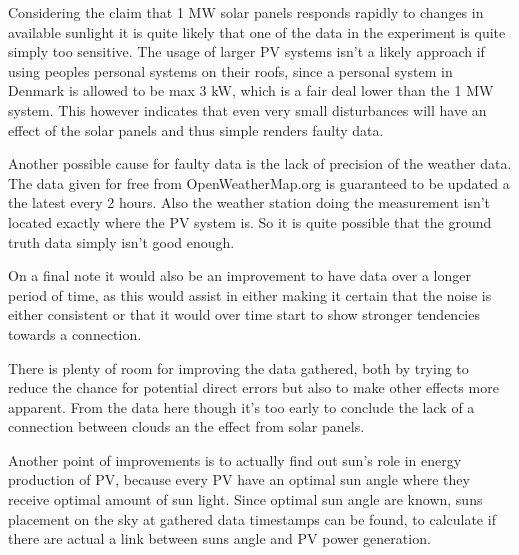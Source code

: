 Considering the claim that 1 MW solar panels responds rapidly to
changes in available sunlight \citep{cloudTrack} it is quite likely
that one of the data in the experiment is quite simply too sensitive.
The usage of larger PV systems isn't a likely approach if using
peoples personal systems on their roofs, since a personal system in
Denmark is allowed to be max 3 kW, which is a fair deal lower than the
1 MW system.  This however indicates that even very small disturbances
will have an effect of the solar panels and thus simple renders faulty
data.

Another possible cause for faulty data is the lack of precision of the
weather data.  The data given for free from OpenWeatherMap.org is
guaranteed to be updated a the latest every 2 hours.  Also the weather
station doing the measurement isn't located exactly where the PV
system is.  So it is quite possible that the ground truth data simply
isn't good enough.

On a final note it would also be an improvement to have data over a
longer period of time, as this would assist in either making it
certain that the noise is either consistent or that it would over time
start to show stronger tendencies towards a connection.

There is plenty of room for improving the data gathered, both by
trying to reduce the chance for potential direct errors but also to
make other effects more apparent.  From the data here though it's too
early to conclude the lack of a connection between clouds an the
effect from solar panels.

Another point of improvements is to actually find out sun's role in energy production of PV, because every PV have an optimal sun angle where they receive optimal amount of sun light. Since optimal sun angle are known, suns placement on the sky at gathered data timestamps can be found, to calculate if there are actual a link between suns angle and PV power generation. 

